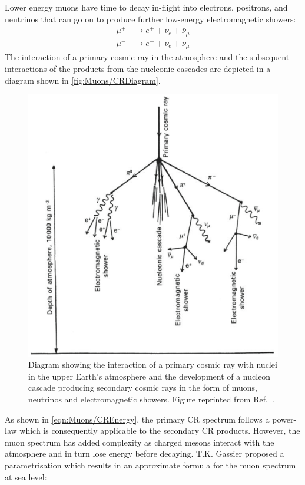 Lower energy muons have time to decay in-flight into electrons, positrons, and neutrinos that can go on to produce further low-energy electromagnetic showers:
\begin{equation}
\begin{split}    
    \mu^+&\rightarrow e^++\nu_e+\bar\nu_\mu \\
    \mu^-&\rightarrow e^-+\bar\nu_e+\nu_\mu
\end{split}
\end{equation}
The interaction of a primary cosmic ray in the atmosphere and the subsequent interactions of the products from the nucleonic cascades are depicted in a diagram shown in \autoref{fig:Muons/CRDiagram}.
\begin{figure}[h!]
    \centering
    \includegraphics[width=0.7\linewidth]{figures/Muons/MuonShower.png}
    \caption[Diagram showing the interaction of a primary cosmic ray with nuclei in the upper Earth's atmosphere and the development of a nucleon cascade.]{Diagram showing the interaction of a primary cosmic ray with nuclei in the upper Earth's atmosphere and the development of a nucleon cascade producing secondary cosmic rays in the form of muons, neutrinos and electromagnetic showers. Figure reprinted from Ref.~\cite{Longair_2011}.}
    \label{fig:Muons/CRDiagram}
\end{figure}
As shown in \autoref{eqn:Muons/CREnergy}, the primary CR spectrum follows a power-law which is consequently applicable to the secondary CR products. However, the muon spectrum has added complexity as charged mesons interact with the atmosphere and in turn lose energy before decaying. T.K. Gassier proposed a parametrisation \cite{Gaisser_Engel_Resconi_2016} which results in an approximate formula for the muon spectrum at sea level:
